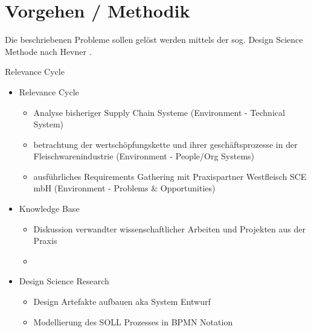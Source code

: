 \section{Vorgehen / Methodik}

Die beschriebenen Probleme sollen gelöst werden mittels der sog. Design Science Methode nach Hevner \citep{Hevner2004, Hevner2007}.

Relevance Cycle \citep{Simon1996}\\

\begin{itemize}
  \item Relevance Cycle
  \begin{itemize}
    \item Analyse bisheriger Supply Chain Systeme (Environment - Technical System)
    \item betrachtung der wertschöpfungskette und ihrer geschäftsprozesse in der Fleischwarenindustrie (Environment - People/Org Systems)
    \item ausführliches Requirements Gathering mit Praxispartner Westfleisch SCE mbH (Environment - Problems \& Opportunities)
  \end{itemize}
  \item Knowledge Base
  \begin{itemize}
    \item Diskussion verwandter wissenschaftlicher Arbeiten und Projekten aus der Praxis
    \item
  \end{itemize}
  \item Design Science Research
  \begin{itemize}
    \item Design Artefakte aufbauen aka System Entwurf
    \item Modellierung des SOLL Prozesses in BPMN Notation
  \end{itemize}
\end{itemize}

\newpage

